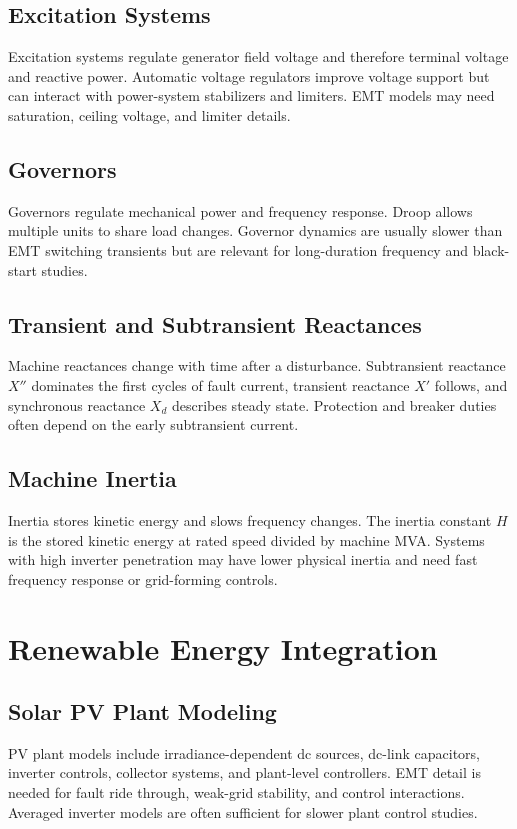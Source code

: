 \documentclass[11pt]{article}
\begin{document}
\subsection{Excitation Systems}
Excitation systems regulate generator field voltage and therefore terminal voltage and reactive power. Automatic voltage regulators improve voltage support but can interact with power-system stabilizers and limiters. EMT models may need saturation, ceiling voltage, and limiter details.

\subsection{Governors}
Governors regulate mechanical power and frequency response. Droop allows multiple units to share load changes. Governor dynamics are usually slower than EMT switching transients but are relevant for long-duration frequency and black-start studies.

\subsection{Transient and Subtransient Reactances}
Machine reactances change with time after a disturbance. Subtransient reactance $X''$ dominates the first cycles of fault current, transient reactance $X'$ follows, and synchronous reactance $X_d$ describes steady state. Protection and breaker duties often depend on the early subtransient current.

\subsection{Machine Inertia}
Inertia stores kinetic energy and slows frequency changes. The inertia constant $H$ is the stored kinetic energy at rated speed divided by machine MVA. Systems with high inverter penetration may have lower physical inertia and need fast frequency response or grid-forming controls.

\section{Renewable Energy Integration}
\subsection{Solar PV Plant Modeling}
PV plant models include irradiance-dependent dc sources, dc-link capacitors, inverter controls, collector systems, and plant-level controllers. EMT detail is needed for fault ride through, weak-grid stability, and control interactions. Averaged inverter models are often sufficient for slower plant control studies.
\end{document}
